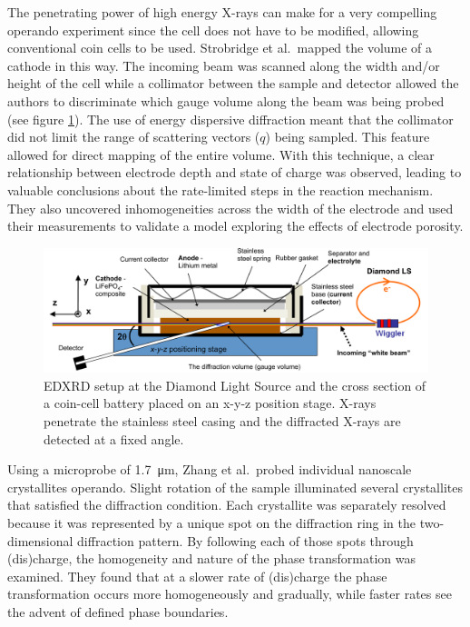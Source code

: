 \documentclass[journal=cmatex,manuscript=perspective]{achemso}
\begin{document}
The penetrating power of high energy X-rays can make for a very
compelling operando experiment since the cell does not have to be
modified, allowing conventional coin cells to be used. Strobridge et
al.\ mapped the volume of a  cathode in this
way\cite{strobridge2015}. The incoming beam was scanned along the
width and/or height of the cell while a collimator between the sample
and detector allowed the authors to discriminate which gauge volume
along the beam was being probed (see figure
\ref{figure:strobridge2015}). The use of energy dispersive diffraction
meant that the collimator did not limit the range of scattering
vectors ($q$) being sampled. This feature allowed for direct mapping
of the entire volume. With this technique, a clear relationship
between electrode depth and state of charge was observed, leading to
valuable conclusions about the rate-limited steps in the reaction
mechanism. They also uncovered inhomogeneities across the width of the
electrode and used their measurements to validate a model exploring
the effects of electrode porosity.

\begin{figure}
  \includegraphics[width=\textwidth]{strobridge2015.png}
  \caption{ EDXRD setup at the Diamond Light Source and the
    cross section of a coin-cell battery placed on an x-y-z position
    stage. X-rays penetrate the stainless steel casing and the
    diffracted X-rays are detected at a fixed angle.\cite{strobridge2015}}
  \label{figure:strobridge2015}
\end{figure}

Using a microprobe of \SI{1.7}{\micro\meter}, Zhang et al.\ probed
individual nanoscale  crystallites operando. Slight
rotation of the sample illuminated several crystallites that satisfied
the diffraction condition. Each crystallite was separately resolved
because it was represented by a unique spot on the diffraction ring in
the two-dimensional diffraction pattern. By following each of those
spots through (dis)charge, the homogeneity and nature of the phase
transformation was examined. They found that at a slower rate of
(dis)charge the phase transformation occurs more homogeneously and
gradually, while faster rates see the advent of defined phase
boundaries\cite{zhang2015-2}.
\end{document}
